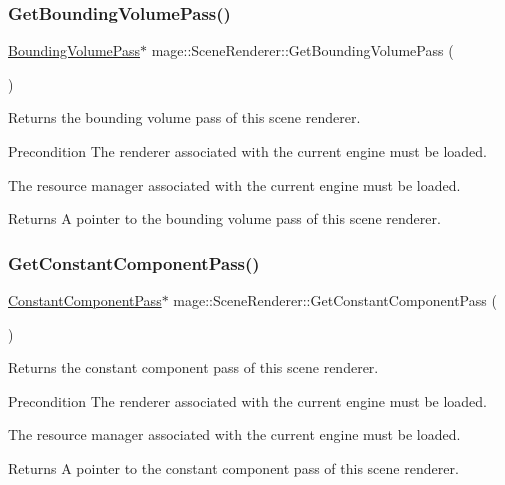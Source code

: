 \subsubsection{\texorpdfstring{Get\+Bounding\+Volume\+Pass()}{GetBoundingVolumePass()}}
{\footnotesize\ttfamily \hyperlink{classmage_1_1_bounding_volume_pass}{Bounding\+Volume\+Pass}$\ast$ mage\+::\+Scene\+Renderer\+::\+Get\+Bounding\+Volume\+Pass (\begin{DoxyParamCaption}{ }\end{DoxyParamCaption})}

Returns the bounding volume pass of this scene renderer.

\begin{DoxyPrecond}{Precondition}
The renderer associated with the current engine must be loaded. 

The resource manager associated with the current engine must be loaded. 
\end{DoxyPrecond}
\begin{DoxyReturn}{Returns}
A pointer to the bounding volume pass of this scene renderer. 
\end{DoxyReturn}
\hypertarget{classmage_1_1_scene_renderer_abc8019f567221458382aedabc4c1d651}{}\label{classmage_1_1_scene_renderer_abc8019f567221458382aedabc4c1d651} 
\subsubsection{\texorpdfstring{Get\+Constant\+Component\+Pass()}{GetConstantComponentPass()}}
{\footnotesize\ttfamily \hyperlink{classmage_1_1_constant_component_pass}{Constant\+Component\+Pass}$\ast$ mage\+::\+Scene\+Renderer\+::\+Get\+Constant\+Component\+Pass (\begin{DoxyParamCaption}{ }\end{DoxyParamCaption})}

Returns the constant component pass of this scene renderer.

\begin{DoxyPrecond}{Precondition}
The renderer associated with the current engine must be loaded. 

The resource manager associated with the current engine must be loaded. 
\end{DoxyPrecond}
\begin{DoxyReturn}{Returns}
A pointer to the constant component pass of this scene renderer. 
\end{DoxyReturn}
\hypertarget{classmage_1_1_scene_renderer_a26f35273609c8850b37f2e78a7c4af32}{}\label{classmage_1_1_scene_renderer_a26f35273609c8850b37f2e78a7c4af32} 
